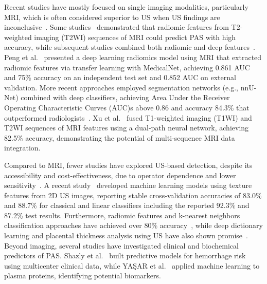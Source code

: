 \documentclass[12pt]{article}
\begin{document}
Recent studies have mostly focused on single imaging modalities, particularly MRI, which is often considered superior to US when US findings are inconclusive~\cite{Romeo_2021}. Some studies~\cite{Romeo_2019, Leitch_2022} demonstrated that radiomic features from T2-weighted imaging (T2WI) sequences of MRI could predict PAS with high accuracy, while subsequent studies combined both radiomic and deep features~\cite{Shao_2021, Peng_2023}. Peng et al.~\cite{Peng_2023} presented a deep learning radiomics model using MRI that extracted radiomic features via transfer learning with MedicalNet, achieving 0.861 AUC and 75\% accuracy on an independent test set and 0.852 AUC on external validation. More recent approaches employed segmentation networks (e.g., nnU-Net) combined with deep classifiers, achieving Area Under the Receiver Operating Characteristic Curves (AUC)s above 0.86 and accuracy 84.3\% that outperformed radiologists~\cite{Wang_2023}. Xu et al.~\cite{Xu_2022} fused T1-weighted imaging (T1WI) and T2WI sequences of MRI features using a dual-path neural network, achieving 82.5\% accuracy, demonstrating the potential of multi-sequence MRI data integration. 

Compared to MRI, fewer studies have explored US-based detection, despite its accessibility and cost-effectiveness, due to operator dependence and lower sensitivity~\cite{Ricciardi_2020, Yang_2022}. A recent study~\cite{Young_2024} developed machine learning models using texture features from 2D US images, reporting stable cross-validation accuracies of 83.0\% and 88.7\% for classical and linear classifiers including the reported 92.3\% and 87.2\% test results. Furthermore, radiomic features and k-nearest neighbors classification approaches have achieved over 80\% accuracy~\cite{Ricciardi_2020}, while deep dictionary learning and placental thickness analysis using US have also shown promise~\cite{Yang_2022, Elmaraghy_2023}. Beyond imaging, several studies have investigated clinical and biochemical predictors of PAS. Shazly et al.~\cite{Shazly_2021} built predictive models for hemorrhage risk using multicenter clinical data, while YAŞAR et al.~\cite{YAŞAR_2022} applied machine learning to plasma proteins, identifying potential biomarkers.  
\end{document}
